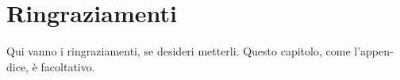 \chapter*{Ringraziamenti}
\begin{otherlanguage}{italian}
Qui vanno i ringraziamenti, se desideri metterli. Questo capitolo, come l'appendice, è facoltativo.
\end{otherlanguage}